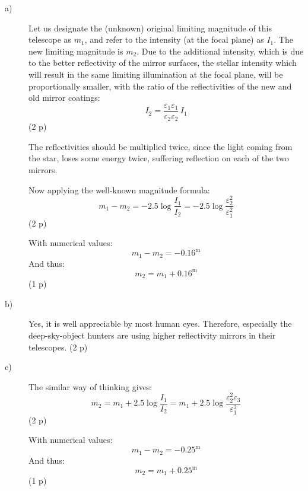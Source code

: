 \begin{description}
\item[a)] Let us designate the (unknown) original limiting magnitude of this
telescope as $m_1$, and refer to the intensity (at the focal plane) as $I_1$.
The new limiting magnitude is $m_2$. Due to the additional intensity, which
is due to the better reflectivity of the mirror surfaces, the stellar
intensity which will result in the same limiting illumination at the focal
plane, will be proportionally smaller, with the ratio of the reflectivities
of the new and old mirror coatings:
\begin{equation*}
I_2 = \frac{\varepsilon_1\varepsilon_1}{\varepsilon_2\varepsilon_2}\,I_1
\tag{4.1}
\end{equation*}
\hfill(2 p)

The reflectivities should be multiplied twice, since the light coming from
the star, loses some energy twice, suffering reflection on each of the two
mirrors.

Now applying the well-known magnitude formula:
\begin{equation*}
m_1 - m_2 = -2.5\log\frac{I_1}{I_2}
          = -2.5\log\frac{\varepsilon_2^2}{\varepsilon_1^2}
\tag{4.2}
\end{equation*}
\hfill(2 p)

With numerical values:
\[ m_1 - m_2 = -0.16^{\mathrm{m}} \]
And thus:
\[ m_2 = m_1 + 0.16^{\mathrm{m}} \]
\hfill(1 p)

\item[b)] %
Yes, it is well appreciable by most human eyes. Therefore,
especially the deep-sky-object hunters are using higher reflectivity mirrors
in their telescopes. \hfill(2 p)

\item[c)] The similar way of thinking gives:
\begin{equation*}
m_2 = m_1 + 2.5\log\frac{I_1}{I_2}
    = m_1 + 2.5\log\frac{\varepsilon_2^2\varepsilon_3}{\varepsilon_1^3}
\tag{4.3}
\end{equation*}
\hfill(2 p)

With numerical values:
\[ m_1 - m_2 = -0.25^{\mathrm{m}} \]
And thus:
\[ m_2 = m_1 + 0.25^{\mathrm{m}} \]
\hfill(1 p)
\end{description}

